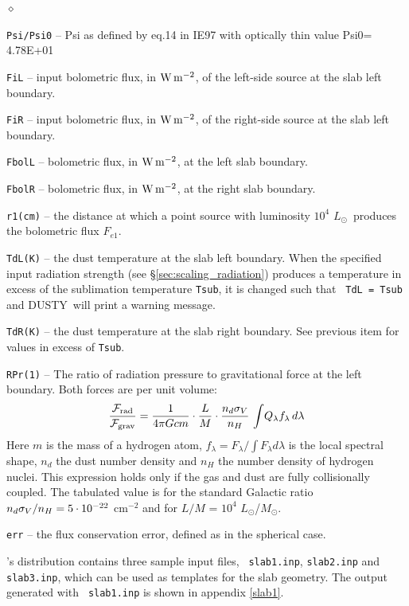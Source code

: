 \documentclass[11pt]{article}
\def\D    {{\sf DUSTY}}
\def\E#1{\hbox{$10^{#1}$}}
\def\eq#1{\begin{equation} #1 \end{equation}}
\def\Mo     {\hbox{$M_{\odot}$}}
\def\Lo     {\hbox{$L_{\odot}$}}
\def\sub#1{_{\rm #1}}
\def\Frad {\hbox{${\cal F}\sub{rad}$}}
\def\Fgrav{\hbox{${\cal F}\sub{grav}$}}
\begin{document}
\begin{list}{$\diamond$}{}
\item{\tt Psi/Psi0} -- Psi as defined by eq.14 in IE97 with optically
  thin value Psi0= 4.78E+01
\item{\tt FiL} -- input bolometric flux, in $\rm W\,m^{-2}$, of the
  left-side source at the slab left boundary.
\item{\tt FiR} -- input bolometric flux, in $\rm W\,m^{-2}$, of the
  right-side source at the slab left boundary.
\item{\tt FbolL} -- bolometric flux, in $\rm W\,m^{-2}$, at the left
  slab boundary.
\item{\tt FbolR} -- bolometric flux, in $\rm W\,m^{-2}$, at the right
  slab boundary.
\item{\tt r1(cm)} -- the distance at which a point source with
  luminosity \E4 \Lo\ produces the bolometric flux $F_{e1}$.
\item {\tt TdL(K)} -- the dust temperature at the slab left
  boundary. When the specified input radiation strength (see
  \S\ref{sec:scaling_radiation}) produces a temperature in excess of
  the sublimation temperature {\tt Tsub}, it is changed such that {\tt
    TdL = Tsub} and \D\ will print a warning message.
\item {\tt TdR(K)} -- the dust temperature at the slab right boundary.
  See previous item for values in excess of {\tt Tsub}.
\item {\tt RPr(1)} -- The ratio of radiation pressure to gravitational
  force at the left boundary. Both forces are per unit volume: \eq{
    {\Frad\over\Fgrav} = {1\over4\pi Gcm} \cdot{L\over M}
    \cdot{n_d\sigma_V\over n_H}\, \int\!Q_\lambda f_\lambda\,d\lambda
  } Here $m$ is the mass of a hydrogen atom, $f_\lambda =
  F_\lambda/\int F_\lambda d\lambda$ is the local spectral shape,
  $n_d$ the dust number density and $n_H$ the number density of
  hydrogen nuclei.  This expression holds only if the gas and dust are
  fully collisionally coupled. The tabulated value is for the standard
  Galactic ratio $n_d\sigma_V/n_H = 5\cdot\E{-22}$ cm$^{-2}$ and for
  $L/M$ = \E4 \Lo/\Mo.
\item{\tt err} -- the flux conservation error, defined as in the
  spherical case.

\end{list}

\bigskip \D's distribution contains three sample input files, {\tt
  slab1.inp}, {\tt slab2.inp} and {\tt slab3.inp}, which can be used
as templates for the slab geometry. The output generated with {\tt
  slab1.inp} is shown in appendix \ref{slab1}.
\end{document}
